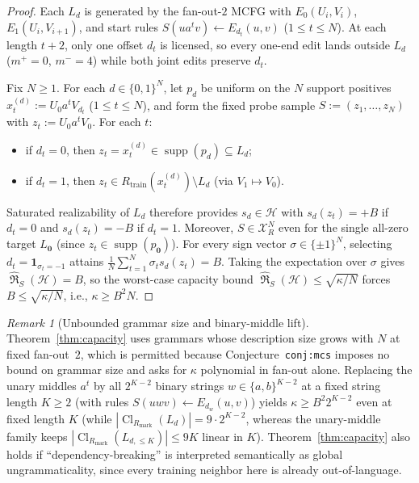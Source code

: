 \documentclass[11pt]{article}
\theoremstyle{plain}
\theoremstyle{definition}
\theoremstyle{remark}
\newtheorem{remark}{Remark}
\DeclareMathOperator{\supp}{supp}
\DeclareMathOperator{\Cl}{Cl}
\DeclareMathOperator{\Rad}{\mathfrak{R}}
\begin{document}
\begin{proof}
Each $L_d$ is generated by the fan-out-$2$ MCFG with $E_0(U_i, V_i)$, $E_1(U_i, V_{i+1})$, and start rules $S(u a^t v) \leftarrow E_{d_t}(u, v)$ ($1 \le t \le N$). At each length $t+2$, only one offset $d_t$ is licensed, so every one-end edit lands outside $L_d$ ($m^+ = 0$, $m^- = 4$) while both joint edits preserve $d_t$.

Fix $N \ge 1$. For each $d \in \{0, 1\}^N$, let $p_d$ be uniform on the $N$ support positives $x_t^{(d)} := U_0 a^t V_{d_t}$ ($1 \le t \le N$), and form the fixed probe sample $S := (z_1, \dots, z_N)$ with $z_t := U_0 a^t V_0$. For each $t$:
\begin{itemize}[leftmargin=2em,itemsep=1pt,topsep=3pt]
\item if $d_t = 0$, then $z_t = x_t^{(d)} \in \supp(p_d) \subseteq L_d$;
\item if $d_t = 1$, then $z_t \in R_{\mathrm{train}}(x_t^{(d)}) \setminus L_d$ (via $V_1 \mapsto V_0$).
\end{itemize}
Saturated realizability of $L_d$ therefore provides $s_d \in \mathcal{H}$ with $s_d(z_t) = +B$ if $d_t = 0$ and $s_d(z_t) = -B$ if $d_t = 1$. Moreover, $S \in \mathcal{X}_R^N$ even for the single all-zero target $L_{\mathbf{0}}$ (since $z_t \in \supp(p_{\mathbf{0}})$). For every sign vector $\sigma \in \{\pm 1\}^N$, selecting $d_t = \mathbf{1}_{\sigma_t = -1}$ attains $\frac{1}{N}\sum_{t=1}^N \sigma_t s_d(z_t) = B$. Taking the expectation over $\sigma$ gives $\widehat{\Rad}_S(\mathcal{H}) = B$, so the worst-case capacity bound $\widehat{\Rad}_S(\mathcal{H}) \le \sqrt{\kappa/N}$ forces $B \le \sqrt{\kappa/N}$, i.e., $\kappa \ge B^2 N$.
\end{proof}

\begin{remark}[Unbounded grammar size and binary-middle lift]
Theorem~\ref{thm:capacity} uses grammars whose description size grows with $N$ at fixed fan-out~$2$, which is permitted because Conjecture~\texttt{conj:mcs} imposes no bound on grammar size and asks for $\kappa$ polynomial in fan-out alone. Replacing the unary middles $a^t$ by all $2^{K-2}$ binary strings $w \in \{a, b\}^{K-2}$ at a fixed string length $K \ge 2$ (with rules $S(uwv) \leftarrow E_{d_w}(u, v)$) yields $\kappa \ge B^2 2^{K-2}$ even at fixed length $K$ (while $|\Cl_{R_{\mathrm{mark}}}(L_d)| = 9 \cdot 2^{K-2}$, whereas the unary-middle family keeps $|\Cl_{R_{\mathrm{mark}}}(L_{d,\le K})| \le 9K$ linear in $K$). Theorem~\ref{thm:capacity} also holds if ``dependency-breaking'' is interpreted semantically as global ungrammaticality, since every training neighbor here is already out-of-language.
\end{remark}
\end{document}
